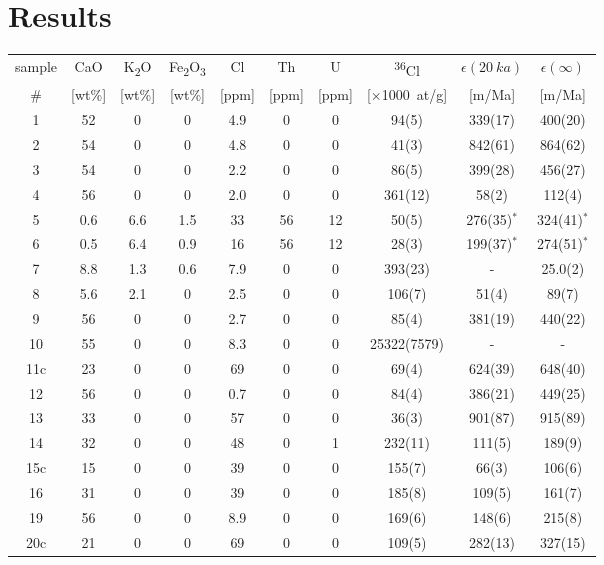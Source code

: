 \documentclass[titlepage]{article}
\begin{document}
\section{Results}
\label{sec:results}

\begin{table}[!ht]
  \centering
  \begin{tabular}{ cccccccccc }
    \hline
    sample & CaO & K\textsubscript{2}O & Fe\textsubscript{2}O\textsubscript{3} &
    Cl & Th & U & \textsuperscript{36}Cl & $\epsilon(20~ka)$ & $\epsilon(\infty)$ \\
    \# & [wt\%] & [wt\%] & [wt\%] & [ppm] & [ppm] & [ppm] & [$\times$1000~at/g] &
    [m/Ma] & [m/Ma] \\ \hline
    1 & 52 & 0 & 0 & 4.9 & 0 & 0 & 94(5) & 339(17) & 400(20) \\
    2 & 54 & 0 & 0 & 4.8 & 0 & 0 & 41(3) & 842(61) & 864(62) \\
    3 & 54 & 0 & 0 & 2.2 & 0 & 0 & 86(5) & 399(28) & 456(27) \\
    4 & 56 & 0 & 0 & 2.0 & 0 & 0 & 361(12) & 58(2) & 112(4) \\
    5 & 0.6 & 6.6 & 1.5 & 33 & 56 & 12 & 50(5) & 276(35)$^\ast$ & 324(41)$^\ast$ \\
    6 & 0.5 & 6.4 & 0.9 & 16 & 56 & 12 & 28(3) & 199(37)$^\ast$ & 274(51)$^\ast$ \\
    7 & 8.8 & 1.3 & 0.6 & 7.9 & 0 & 0 & 393(23) & - & 25.0(2) \\
    8 & 5.6 & 2.1 & 0 & 2.5 & 0 & 0 & 106(7) & 51(4) & 89(7) \\
    9 & 56 & 0 & 0 & 2.7 & 0 & 0 & 85(4) & 381(19) & 440(22) \\
    10 & 55 & 0 & 0 & 8.3 & 0 & 0 & 25322(7579) & - & - \\
    11c & 23 & 0 & 0 & 69 & 0 & 0 & 69(4) & 624(39) & 648(40) \\
    12 & 56 & 0 & 0 & 0.7 & 0 & 0 & 84(4) & 386(21) & 449(25) \\
    13 & 33 & 0 & 0 & 57 & 0 & 0 & 36(3) & 901(87) & 915(89) \\
    14 & 32 & 0 & 0 & 48 & 0 & 1 & 232(11) & 111(5) & 189(9) \\
    15c & 15 & 0 & 0 & 39 & 0 & 0 & 155(7) & 66(3) & 106(6) \\
    16 & 31 & 0 & 0 & 39 & 0 & 0 & 185(8) & 109(5) & 161(7) \\
    19 & 56 & 0 & 0 & 8.9 & 0 & 0 & 169(6) & 148(6) & 215(8) \\
    20c & 21 & 0 & 0 & 69 & 0 & 0 & 109(5) & 282(13) & 327(15) \\ \hline

\end{tabular}
\end{table}
\end{document}
